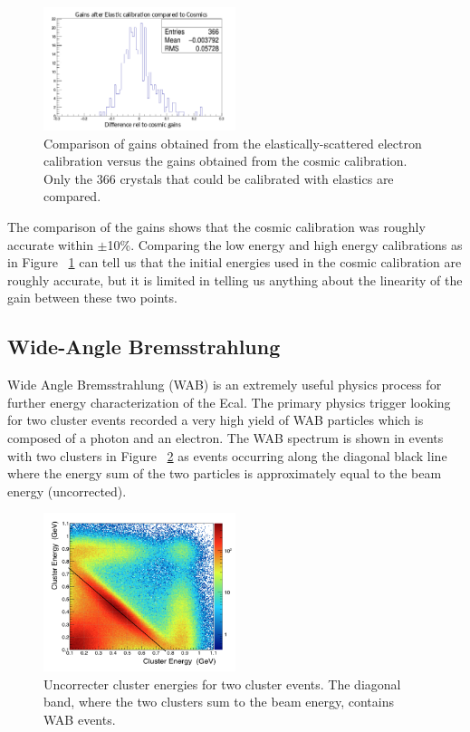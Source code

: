 \documentclass[twoside]{article}
\begin{document}
\begin{multicols}{2}
\begin{figure}[H]
  \centering
      \includegraphics[width=0.5\textwidth]{pics/feeVcosmics.png}
  \caption{Comparison of gains obtained from the elastically-scattered electron calibration versus the gains obtained from the cosmic calibration. Only the 366 crystals that could be calibrated with elastics are compared.}
  \label{gaincomp}
\end{figure} 

The comparison of the gains shows that the cosmic calibration was roughly accurate within $\pm$10\%. Comparing the low energy and high energy calibrations as in Figure ~\ref{gaincomp} can tell us that the initial energies used in the cosmic calibration are roughly accurate, but it is limited in telling us anything about the linearity of the gain between these two points.  

\subsection{Wide-Angle Bremsstrahlung}
Wide Angle Bremsstrahlung (WAB) is an extremely useful physics process for  further energy characterization of the Ecal. The primary physics trigger looking for two cluster events recorded a very high yield of WAB particles which is composed of a photon and an electron. The WAB spectrum is shown in events with two clusters in Figure ~\ref{WABband} as events occurring along the diagonal black line where the energy sum of the two particles is approximately equal to the beam energy (uncorrected).

\begin{figure}[H]
  \centering
      \includegraphics[width=0.5\textwidth]{pics/twoclusterenergies.png}
  \caption{Uncorrecter cluster energies for two cluster events. The diagonal band, where the two clusters sum to the beam energy, contains WAB events.}
  \label{WABband}
\end{figure} 


\end{multicols}
\end{document}
